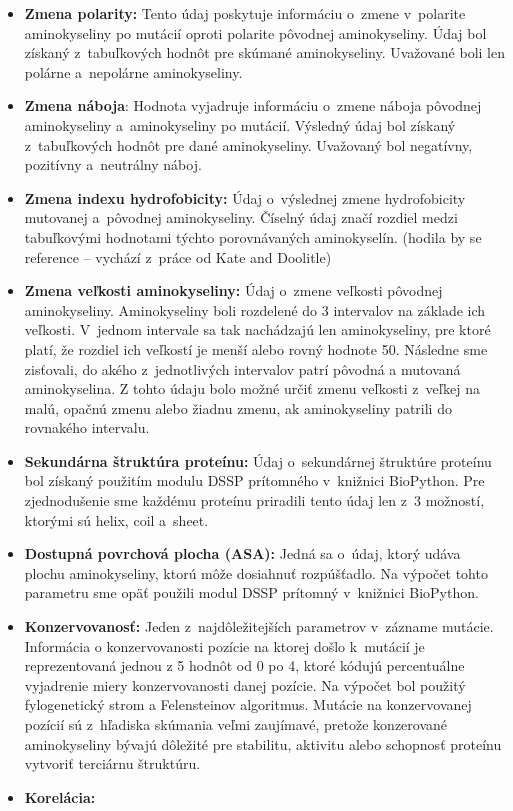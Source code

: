 \begin{itemize}
	\item \textbf{Zmena polarity:} Tento údaj poskytuje informáciu o zmene v polarite aminokyseliny po mutácií oproti polarite pôvodnej aminokyseliny. Údaj bol získaný z tabuľkových hodnôt pre skúmané aminokyseliny. Uvažované boli len polárne a nepolárne aminokyseliny.
	\item \textbf{Zmena náboja}: Hodnota vyjadruje informáciu o zmene náboja pôvodnej aminokyseliny a aminokyseliny po mutácií. Výsledný údaj bol získaný z tabuľkových hodnôt pre dané aminokyseliny. Uvažovaný bol negatívny, pozitívny a neutrálny náboj. 
	\item \textbf{Zmena indexu hydrofobicity:} Údaj o výslednej zmene hydrofobicity mutovanej a pôvodnej aminokyseliny. Číselný údaj značí rozdiel medzi tabuľkovými hodnotami týchto porovnávaných aminokyselín. (hodila by se reference – vychází z práce od Kate and Doolitle)
	\item \textbf{Zmena veľkosti aminokyseliny:} Údaj o zmene veľkosti pôvodnej aminokyseliny. Aminokyseliny boli rozdelené do 3 intervalov na základe ich veľkosti. V jednom intervale sa tak nachádzajú len aminokyseliny, pre ktoré platí, že rozdiel ich veľkostí je menší alebo rovný hodnote 50. Následne sme zisťovali, do akého z jednotlivých intervalov patrí pôvodná a mutovaná aminokyselina. Z tohto údaju bolo možné určiť zmenu veľkosti z veľkej na malú, opačnú zmenu alebo žiadnu zmenu, ak aminokyseliny patrili do rovnakého intervalu.
	\item \textbf{Sekundárna štruktúra proteínu:} Údaj o sekundárnej štruktúre proteínu bol získaný použitím modulu DSSP prítomného v knižnici BioPython. Pre zjednodušenie sme každému proteínu priradili tento údaj len z 3 možností, ktorými sú helix, coil a sheet.
	\item \textbf{Dostupná povrchová plocha (ASA):} Jedná sa o údaj, ktorý udáva plochu aminokyseliny, ktorú môže dosiahnuť rozpúšťadlo. Na výpočet tohto parametru sme opäť použili modul DSSP prítomný v knižnici BioPython.
	\item \textbf{Konzervovanosť:} Jeden z najdôležitejších parametrov v zázname mutácie. Informácia o konzervovanosti pozície na ktorej došlo k mutácií je reprezentovaná
	jednou z 5 hodnôt od 0 po 4, ktoré kódujú percentuálne vyjadrenie miery konzervovanosti danej pozície. Na výpočet bol použitý fylogenetický strom a Felensteinov algoritmus. Mutácie na konzervovanej pozícií sú z hľadiska skúmania veľmi zaujímavé, pretože konzerované aminokyseliny bývajú dôležité pre stabilitu, aktivitu alebo schopnosť proteínu vytvoriť terciárnu štruktúru.
	\item \textbf{Korelácia:}
	
\end{itemize}


